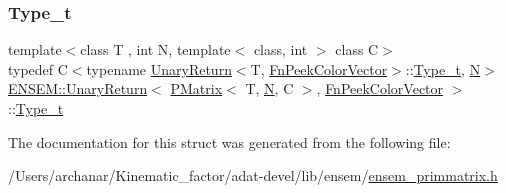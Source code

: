 \subsubsection{\texorpdfstring{Type\_t}{Type\_t}\hspace{0.1cm}{\footnotesize\ttfamily [3/3]}}
{\footnotesize\ttfamily template$<$class T , int N, template$<$ class, int $>$ class C$>$ \\
typedef C$<$typename \mbox{\hyperlink{structENSEM_1_1UnaryReturn}{Unary\+Return}}$<$T, \mbox{\hyperlink{structENSEM_1_1FnPeekColorVector}{Fn\+Peek\+Color\+Vector}}$>$\+::\mbox{\hyperlink{structENSEM_1_1UnaryReturn_3_01PMatrix_3_01T_00_01N_00_01C_01_4_00_01FnPeekColorVector_01_4_a4b620d05d14bc1c08dc440f5f444f0e9}{Type\+\_\+t}}, \mbox{\hyperlink{adat__devel_2lib_2hadron_2operator__name__util_8cc_a7722c8ecbb62d99aee7ce68b1752f337}{N}}$>$ \mbox{\hyperlink{structENSEM_1_1UnaryReturn}{E\+N\+S\+E\+M\+::\+Unary\+Return}}$<$ \mbox{\hyperlink{classENSEM_1_1PMatrix}{P\+Matrix}}$<$ T, \mbox{\hyperlink{adat__devel_2lib_2hadron_2operator__name__util_8cc_a7722c8ecbb62d99aee7ce68b1752f337}{N}}, C $>$, \mbox{\hyperlink{structENSEM_1_1FnPeekColorVector}{Fn\+Peek\+Color\+Vector}} $>$\+::\mbox{\hyperlink{structENSEM_1_1UnaryReturn_3_01PMatrix_3_01T_00_01N_00_01C_01_4_00_01FnPeekColorVector_01_4_a4b620d05d14bc1c08dc440f5f444f0e9}{Type\+\_\+t}}}



The documentation for this struct was generated from the following file\+:\begin{DoxyCompactItemize}
\item 
/\+Users/archanar/\+Kinematic\+\_\+factor/adat-\/devel/lib/ensem/\mbox{\hyperlink{adat-devel_2lib_2ensem_2ensem__primmatrix_8h}{ensem\+\_\+primmatrix.\+h}}\end{DoxyCompactItemize}
